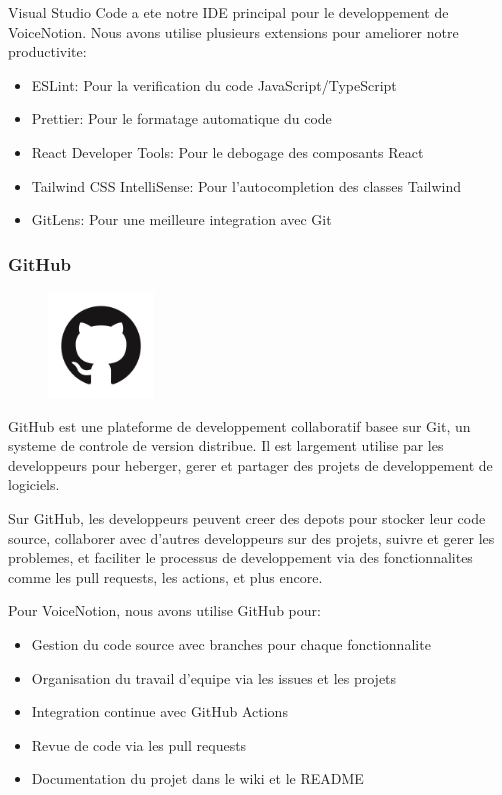Visual Studio Code a ete notre IDE principal pour le developpement de VoiceNotion. Nous avons utilise plusieurs extensions pour ameliorer notre productivite:

\begin{itemize}
    \item ESLint: Pour la verification du code JavaScript/TypeScript
    \item Prettier: Pour le formatage automatique du code
    \item React Developer Tools: Pour le debogage des composants React
    \item Tailwind CSS IntelliSense: Pour l'autocompletion des classes Tailwind
    \item GitLens: Pour une meilleure integration avec Git
\end{itemize}

\subsubsection{GitHub}
\begin{figure}
    \centering
    \includegraphics[width=0.25\textwidth]{assets/docs/github.png}
\end{figure}
GitHub est une plateforme de developpement collaboratif basee sur Git, un systeme de controle de version distribue. Il est largement utilise par les developpeurs pour heberger, gerer et partager des projets de developpement de logiciels.

Sur GitHub, les developpeurs peuvent creer des depots pour stocker leur code source, collaborer avec d'autres developpeurs sur des projets, suivre et gerer les problemes, et faciliter le processus de developpement via des fonctionnalites comme les pull requests, les actions, et plus encore.

Pour VoiceNotion, nous avons utilise GitHub pour:
\begin{itemize}
    \item Gestion du code source avec branches pour chaque fonctionnalite
    \item Organisation du travail d'equipe via les issues et les projets
    \item Integration continue avec GitHub Actions
    \item Revue de code via les pull requests
    \item Documentation du projet dans le wiki et le README
\end{itemize}

